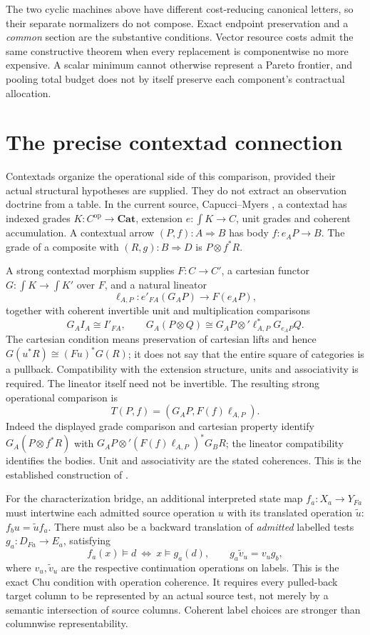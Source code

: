 \documentclass[11pt]{article}
\theoremstyle{definition}\newtheorem{definition}[theorem]{Definition}
\theoremstyle{remark}\newtheorem{remark}[theorem]{Remark}
\newcommand{\Cat}{\mathbf{Cat}}
\begin{document}
The two cyclic machines above have different cost-reducing canonical
letters, so their separate normalizers do not compose. Exact endpoint
preservation and a \emph{common} section are the substantive conditions.
Vector resource costs admit the same constructive theorem when every
replacement is componentwise no more expensive. A scalar minimum cannot
otherwise represent a Pareto frontier, and pooling total budget does not
by itself preserve each component's contractual allocation.


\section{The precise contextad connection}\label{sec:contextads}
Contextads organize the operational side of this comparison, provided their
actual structural hypotheses are supplied. They do not extract an
observation doctrine from a table. In the current source, Capucci--Myers
\cite[Definition 5.25, Examples 5.33--5.35]{CM2}, a contextad has indexed
grades $K:C^{\mathrm{op}}\to\Cat$, extension $e:\int K\to C$,
unit grades and coherent accumulation. A contextual arrow $(P,f):A\Rightarrow B$
has body $f:e_AP\to B$. The grade of a composite with $(R,g):B\Rightarrow D$
is $P\otimes f^*R$.

A strong contextad morphism supplies $F:C\to C'$, a cartesian functor
$G:\int K\to\int K'$ over $F$, and a natural lineator
\[
 \ell_{A,P}:e'_{FA}(G_AP)\longrightarrow F(e_AP),
\]
together with coherent invertible unit and multiplication comparisons
\[
 G_AI_A\cong I'_{FA},\qquad
 G_A(P\otimes Q)\cong
 G_AP\otimes'\ell_{A,P}^*G_{e_AP}Q.
\]
The cartesian condition means preservation of cartesian lifts and hence
$G(u^*R)\cong(Fu)^*G(R)$; it does not say that the entire square of
categories is a pullback. Compatibility with the extension structure,
units and associativity is required. The lineator itself need not be
invertible. The resulting strong operational comparison is
\[
 T(P,f)=(G_AP,F(f)\ell_{A,P}).
\]
Indeed the displayed grade comparison and cartesian property identify
$G_A(P\otimes f^*R)$ with
$G_AP\otimes'(F(f)\ell_{A,P})^*G_BR$; the lineator compatibility
identifies the bodies. Unit and associativity are the stated coherences.
This is the established construction of \cite[equations (5.6.20)--(5.6.21)]{CM2}.

For the characterization bridge, an additional interpreted state map
$f_a:X_a\to Y_{Fa}$ must intertwine each admitted source operation $u$
with its translated operation $\widetilde u$:
$f_bu=\widetilde u f_a$. There must also be a backward translation of
\emph{admitted} labelled tests $g_a:D_{Fa}\to E_a$, satisfying
\[
 f_a(x)\models d\ \Longleftrightarrow\ x\models g_a(d),
 \qquad g_a\widetilde v_u=v_ug_b,
\]
where $v_u,\widetilde v_u$ are the respective continuation operations
on labels. This is the exact Chu condition with operation coherence.
It requires every pulled-back target column to be represented by an
actual source test, not merely by a semantic intersection of source columns.
Coherent label choices are stronger than columnwise representability.
\end{document}
